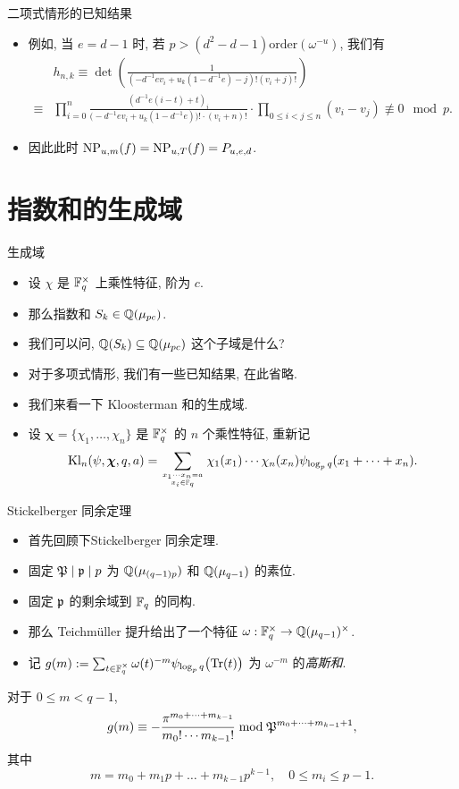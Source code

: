\documentclass[aspectratio=169,handout]{ctexbeamer}
\newcommand\bchi{{\boldsymbol\chi}}
\begin{document}
\begin{frame}{二项式情形的已知结果}
	\begin{itemize}
		\item 例如, 当 $e=d-1$ 时, 若 $p>(d^2-d-1)\mathrm{order}(\omega^{-u})$, 我们有
		\[
			\begin{split}
				&h_{n,k}\equiv\det\left(\frac{1}{(-d^{-1}ev_i+u_k(1-d^{-1}e)-j)!(v_i+j)!}\right)\\
				\equiv &\prod_{i=0}^n \frac{\left(d^{-1}e(i-t)+t\right)_i}{\bigl(-d^{-1}ev_i+u_k(1-d^{-1}e)\bigr)!\cdot(v_i+n)!} \cdot \prod_{0\le i<j\le n}(v_i-v_j)\not\equiv 0\mod p.
			\end{split}
		\]
		\item 因此此时 ${\mathrm{NP}}_{u,m}(f)={\mathrm{NP}}_{u,T}(f)=P_{u,e,d}$.
	\end{itemize}
\end{frame}


\section{指数和的生成域}


\begin{frame}{生成域}
	\begin{itemize}
		\item 设 $\chi$ 是 ${\mathbb{F}}_q^\times$ 上乘性特征, 阶为 $c$.
		\item 那么指数和 $S_k\in{\mathbb{Q}}(\mu_{pc})$.
		\item 我们可以问, ${\mathbb{Q}}(S_k)\subseteq {\mathbb{Q}}(\mu_{pc})$ 这个子域是什么?
		\item 对于多项式情形, 我们有一些已知结果, 在此省略.
		\item 我们来看一下 Kloosterman 和的生成域.
		\item 设 $\bchi=\{\chi_1,\dots,\chi_n\}$ 是 ${\mathbb{F}}_q^\times$ 的 $n$ 个乘性特征, 重新记
		\[
			\Kl_n(\psi,\bchi,q,a)=\sum_{x_1\cdots x_n=a\atop x_i\in\BF_{q}}\chi_1(x_1)\cdots\chi_n(x_n)\psi_{\log_p q}(x_1+\cdots+x_n).
		\]
	\end{itemize}
\end{frame}


\begin{frame}{Stickelberger 同余定理}
	\begin{itemize}
		\item 首先回顾下Stickelberger 同余定理.
		\item 固定 ${\mathfrak{P}}\mid {\mathfrak{p}} \mid p$ 为 ${\mathbb{Q}}(\mu_{(q-1)p})$ 和 ${\mathbb{Q}}(\mu_{q-1})$ 的素位.
		\item 固定 ${\mathfrak{p}}$ 的剩余域到 ${\mathbb{F}}_q$ 的同构.
		\item 那么 Teichm\"uller 提升给出了一个特征 $\omega:{\mathbb{F}}_q^\times\to{\mathbb{Q}}(\mu_{q-1})^\times$.
		\item 记 $g(m):=\sum_{t\in{\mathbb{F}}_q^\times}\omega(t)^{-m}\psi_{\log_p q}\bigl({\mathrm{Tr}}(t)\bigr)$ 为 $\omega^{-m}$ 的\emph{高斯和}.
	\end{itemize}
	\onslide<+->
	\begin{theorem}
		对于 $0\le m<q-1$,
		\[
			g(m)\equiv -\frac{\pi^{m_0+\dots +m_{k-1}}}{m_0!\cdots m_{k-1}!} \bmod {\mathfrak{P}}^{m_0+\dots+m_{k-1}+1},
		\]
		其中
		\[
			m=m_0+m_1p+\dots+m_{k-1}p^{k-1},\quad
			0\le m_i\le p-1.
		\]
	\end{theorem}
\end{frame}
\end{document}
